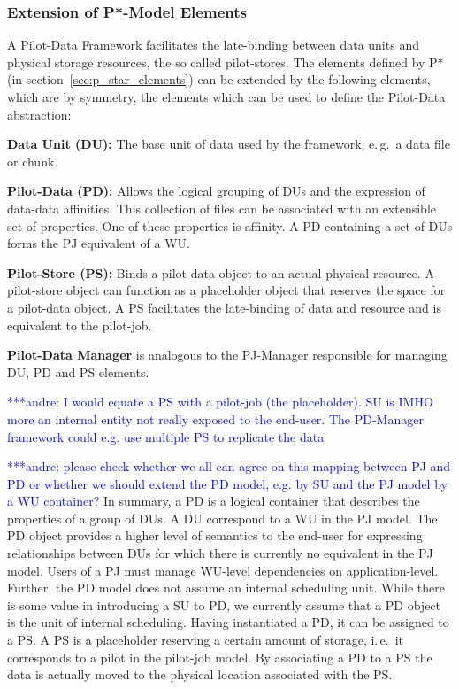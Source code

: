\documentclass[conference,final]{IEEEtran}
\newcommand{\jhanote}[1]{ {\textcolor{red} { ***shantenu: #1 }}}
\newcommand{\alnote}[1]{ {\textcolor{blue} { ***andre: #1 }}}
\newcommand{\alnote}[1]{}
\newcommand{\jhanote}[1]{}
\begin{document}
\subsubsection*{Extension of P*-Model Elements}


A Pilot-Data Framework facilitates the late-binding between data units and
physical storage resources, the so called pilot-stores. The elements defined by
P* (in section~\ref{sec:p_star_elements}) can be extended by the following
elements, which are by symmetry, the elements which can be used to define the
Pilot-Data abstraction:
\begin{compactenum}[A.]
\item \textbf{Data Unit (DU):} The base unit of data used by the framework,
  e.\,g.\ a data file or chunk. 
\item \textbf{Pilot-Data (PD):} Allows the logical grouping of DUs
  and the expression of data-data affinities. This collection of files
  can be associated with an extensible set of properties. One of these
  properties is affinity. A PD containing a set of DUs forms the PJ
  equivalent of a WU.
\item \textbf{Pilot-Store (PS):} Binds a pilot-data object to an actual
	  physical resource. A pilot-store object can function as a
	  placeholder object that reserves the space for a pilot-data object. A PS  
	  facilitates the late-binding of data and resource and is equivalent to the 
	  pilot-job.
\item \textbf{Pilot-Data Manager} is analogous to the PJ-Manager responsible for 
  managing DU, PD and PS elements. 
\end{compactenum}

\alnote{I would equate a PS with a pilot-job (the placeholder). SU is
  IMHO more an internal entity not really exposed to the end-user. The
  PD-Manager framework could e.g. use multiple PS to replicate the
  data}

\alnote{please check whether we all can agree on this mapping between PJ and PD or whether we should extend the PD model, e.g. by SU and the PJ model by a WU container?}
In summary, a PD is a logical container that describes the properties of a group
of DUs. A DU correspond to a WU in the PJ model. The PD object provides a
higher level of semantics to the end-user for expressing relationships between
DUs for which there is currently no equivalent in the PJ model. Users of a PJ
must manage WU-level dependencies on application-level. Further, the PD model
does not assume an internal scheduling unit. While there is some value in
introducing a SU to PD, we currently assume that a PD object is
the unit of internal scheduling. Having instantiated a PD, it can be assigned to
a PS. A PS is a placeholder reserving a certain amount of storage, i.\,e.\ it
corresponds to a pilot in the pilot-job model. By associating a PD to a PS the
data is actually moved to the physical location associated with the PS.
\end{document}
